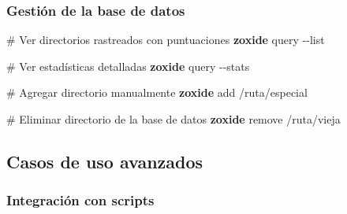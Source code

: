 \documentclass[
  11pt,
  letterpaper,
  oneside,
  openany]{scrbook}
\newenvironment{Shaded}{}{}
\newcommand{\AttributeTok}[1]{\textcolor[rgb]{0.84,0.23,0.29}{#1}}
\newcommand{\BuiltInTok}[1]{\textcolor[rgb]{0.84,0.23,0.29}{#1}}
\newcommand{\CommentTok}[1]{\textcolor[rgb]{0.42,0.45,0.49}{#1}}
\newcommand{\ControlFlowTok}[1]{\textcolor[rgb]{0.84,0.23,0.29}{#1}}
\newcommand{\ExtensionTok}[1]{\textcolor[rgb]{0.84,0.23,0.29}{\textbf{#1}}}
\newcommand{\KeywordTok}[1]{\textcolor[rgb]{0.84,0.23,0.29}{#1}}
\newcommand{\NormalTok}[1]{\textcolor[rgb]{0.14,0.16,0.18}{#1}}
\newcommand{\OperatorTok}[1]{\textcolor[rgb]{0.14,0.16,0.18}{#1}}
\newcommand{\OtherTok}[1]{\textcolor[rgb]{0.44,0.26,0.76}{#1}}
\newcommand{\StringTok}[1]{\textcolor[rgb]{0.01,0.18,0.38}{#1}}
\newcommand{\VariableTok}[1]{\textcolor[rgb]{0.89,0.38,0.04}{#1}}
\begin{document}
\subsubsection{Gestión de la base de
datos}\label{gestiuxf3n-de-la-base-de-datos}

\begin{Shaded}
\begin{Highlighting}[]
\CommentTok{\# Ver directorios rastreados con puntuaciones}
\ExtensionTok{zoxide}\NormalTok{ query }\AttributeTok{{-}{-}list}

\CommentTok{\# Ver estadísticas detalladas}
\ExtensionTok{zoxide}\NormalTok{ query }\AttributeTok{{-}{-}stats}

\CommentTok{\# Agregar directorio manualmente}
\ExtensionTok{zoxide}\NormalTok{ add /ruta/especial}

\CommentTok{\# Eliminar directorio de la base de datos}
\ExtensionTok{zoxide}\NormalTok{ remove /ruta/vieja}
\end{Highlighting}
\end{Shaded}

\subsection{Casos de uso avanzados}\label{casos-de-uso-avanzados-3}

\subsubsection{Integración con
scripts}\label{integraciuxf3n-con-scripts}

\begin{Shaded}
\end{Shaded}
\end{document}
